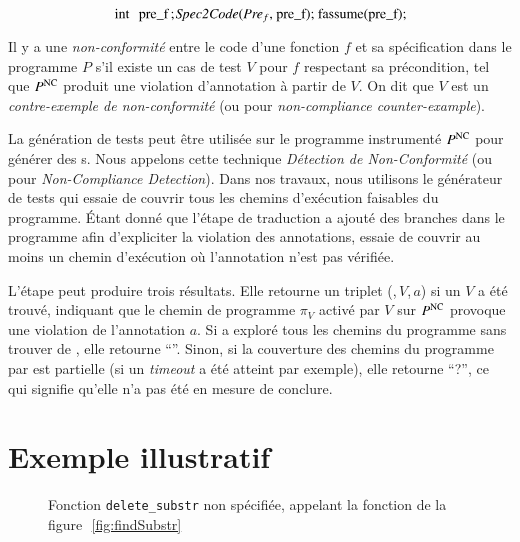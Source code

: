 \begin{equation}
\mbox{\lstinline[mathescape]'int pre_f; $~\mathit{Spec2Code}$($\textit{Pre}_f$, pre_f); fassume(pre_f);'}
\end{equation}

\begin{definition} 
  \label{def:NC}
  Il y a une \emph{non-conformité} entre le code d'une fonction $f$ et sa
  spécification dans le programme $P$ s'il existe un cas de test $V$ pour $f$
  respectant sa précondition, tel que $P^{\mathrm{NC}}$ produit une violation
  d'annotation à partir de $V$.
  On dit que $V$ est un \emph{contre-exemple de non-conformité} (ou \NCCE pour
  \textit{non-compliance counter-example}).
\end{definition}

La génération de tests peut être utilisée sur le programme instrumenté $P^{\mathrm{NC}}$
pour générer des \NCCE{}s.
Nous appelons cette technique \emph{Détection de Non-Conformité} (ou \NCD pour
\textit{Non-Compliance Detection}).
Dans nos travaux, nous utilisons le générateur de tests \pathcrawler qui essaie
de couvrir tous les chemins d'exécution faisables du programme.
Étant donné que l'étape de traduction a ajouté des branches dans le programme
afin d'expliciter la violation des annotations, \pathcrawler essaie de couvrir
au moins un chemin d'exécution où l'annotation n'est pas vérifiée.

L'étape \NCD peut produire trois résultats.
Elle retourne un triplet (\nc,\,$V$,\,$a$) si un \NCCE $V$ a été trouvé,
indiquant que le chemin de programme $\pi_V$ activé par $V$ sur $P^{\mathrm{NC}}$
provoque une violation de l'annotation $a$.
Si \NCD a exploré tous les chemins du programme sans trouver de \NCCE, elle
retourne ``\no''.
Sinon, si la couverture des chemins du programme par \NCD est partielle (si
un {\em timeout} a été atteint par exemple), elle retourne ``\textsf{?}'', ce
qui signifie qu'elle n'a pas été en mesure de conclure.


\section{Exemple illustratif}
\label{sec:ncd-ex}


\begin{figure}[t]
  
  \vspace{-3mm}
  \caption{Fonction \lstinline{delete_substr} non spécifiée, appelant la
    fonction de la figure~\,\ref{fig:findSubstr}}
  \vspace{-3mm}
  \label{fig:deleteSubstrTrous}
\end{figure}

